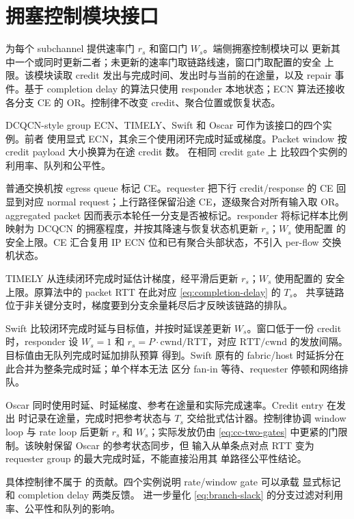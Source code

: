 \chapter{拥塞控制模块接口}
\label{app:rate-modules}

 为每个 subchannel 提供速率门 $r_s$ 和窗口门 $W_s$。端侧拥塞控制模块可以
更新其中一个或同时更新二者；未更新的速率门取链路线速，窗口门取配置的安全
上限。该模块读取 credit 发出与完成时间、发出时与当前的在途量，以及 repair
事件。基于 completion delay 的算法只使用 responder 本地状态；ECN 算法还接收
各分支 CE 的 OR。控制律不改变 credit、聚合位置或恢复状态。

DCQCN-style group ECN、TIMELY、Swift 和 Oscar 可作为该接口的四个实例。前者
使用显式 ECN，其余三个使用闭环完成时延或梯度。Packet window 按 credit
payload 大小换算为在途 credit 数。 在相同 credit gate 上
比较四个实例的利用率、队列和公平性。

普通交换机按 egress queue 标记 CE。requester 把下行 credit/response 的 CE
回显到对应 normal request；上行路径保留沿途 CE，逐级聚合对所有输入取 OR。
aggregated packet 因而表示本轮任一分支是否被标记。responder 将标记样本比例
映射为 DCQCN 的拥塞程度，并按其降速与恢复状态机更新 $r_s$；$W_s$ 使用配置
的安全上限。CE 汇合复用 IP ECN 位和已有聚合头部状态，不引入 per-flow
交换机状态。

TIMELY 从连续闭环完成时延估计梯度，经平滑后更新 $r_s$；$W_s$ 使用配置的
安全上限。原算法中的 packet RTT 在此对应 \cref{eq:completion-delay} 的 $T_s$。
共享链路位于非关键分支时，梯度要到分支余量耗尽后才反映该链路的排队。

Swift 比较闭环完成时延与目标值，并按时延误差更新 $W_s$。窗口低于一份 credit
时，responder 设 $W_s=1$ 和 $r_s=P\cdot\mathrm{cwnd}/\mathrm{RTT}$，对应
$\mathrm{RTT}/\mathrm{cwnd}$ 的发放间隔。目标值由无队列完成时延加排队预算
得到。Swift 原有的 fabric/host 时延拆分在此合并为整条完成时延；单个样本无法
区分 fan-in 等待、requester 停顿和网络排队。

Oscar 同时使用时延、时延梯度、参考在途量和实际完成速率。Credit entry 在发出
时记录在途量，完成时把参考状态与 $T_s$ 交给批式估计器。控制律协调 window
loop 与 rate loop 后更新 $r_s$ 和 $W_s$；实际发放仍由
\cref{eq:cc-two-gates} 中更紧的门限制。该映射保留 Oscar 的参考状态同步，但
输入从单条点对点 RTT 变为 requester group 的最大完成时延，不能直接沿用其
单路径公平性结论。

具体控制律不属于 \sysname 的贡献。四个实例说明 rate/window gate 可以承载
显式标记和 completion delay 两类反馈。 进一步量化
\cref{eq:branch-slack} 的分支过滤对利用率、公平性和队列的影响。

